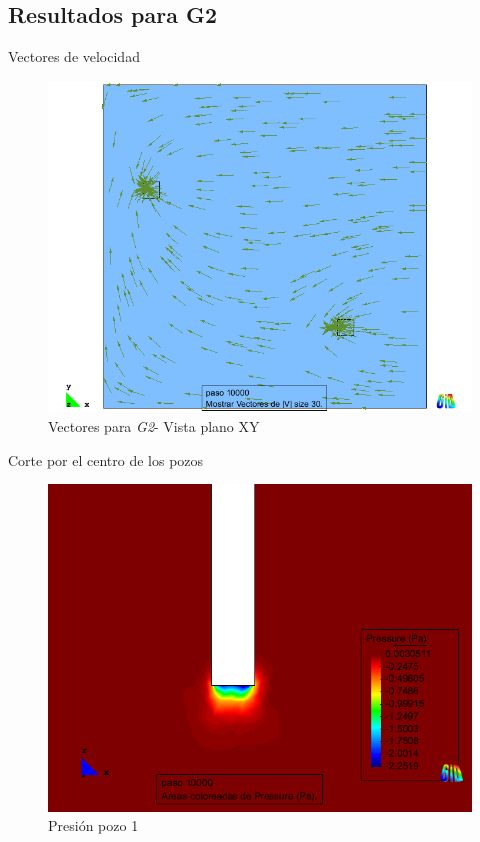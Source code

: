 \documentclass[spanish]{beamer}
\begin{document}
\subsection{Resultados para G2}
\begin{frame}{Vectores de velocidad}
\begin{center}
\begin{figure}[htbp]
\centerline{\includegraphics[scale=0.3]{../img/200m/resul/200_xy_vectores}}
\caption{Vectores para \emph{G2}- Vista plano XY}
\end{figure}
\end{center}
\end{frame}
%
\begin{frame}{Corte por el centro de los pozos}
\begin{center}
\begin{figure}[htbp]
\centerline{\includegraphics[scale=0.3]{../img/200m/resul/200_XZ_presion_corte_centro_pozo1}}
\caption{Presión pozo 1}
\end{figure}
\end{center}
\end{frame}
\end{document}
